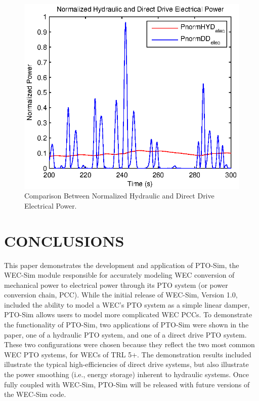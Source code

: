 \documentclass[twocolumn,10pt]{asme2e}
\begin{document}
\begin{figure}[t]
    \centering
    \includegraphics[width=1\columnwidth]{Images/HDYnDDelecPower}
    \caption{Comparison Between Normalized Hydraulic and Direct Drive Electrical Power.}
    \label{Pnorm}
    \end{figure}


\section*{CONCLUSIONS}

This paper demonstrates the development and application of PTO-Sim, the WEC-Sim module responsible for accurately modeling WEC conversion of mechanical power to electrical power through its PTO system (or power conversion chain, PCC). While the initial release of WEC-Sim, Version 1.0, included the ability to model a WEC's PTO system as a simple linear damper, PTO-Sim allows users to model more complicated WEC PCCs. To demonstrate the functionality of PTO-Sim, two applications of PTO-Sim were shown in the paper, one of a hydraulic PTO system, and one of a direct drive PTO system. These two configurations were chosen because they reflect the two most common WEC PTO systems, for WECs of TRL 5+.  The demonstration results included illustrate the typical high-efficiencies of direct drive systems, but also illustrate the power smoothing (i.e., energy storage) inherent to hydraulic systems.  Once fully coupled with WEC-Sim, PTO-Sim will be released with future versions of the WEC-Sim code.
\end{document}
